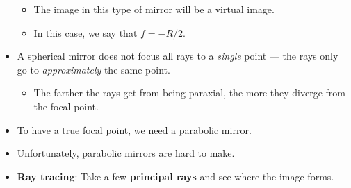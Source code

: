 \documentclass[../notes.tex]{subfiles}
\begin{document}
\begin{itemize}
    \begin{itemize}
        \item The image in this type of mirror will be a virtual image.
        \item In this case, we say that $f=-R/2$.
    \end{itemize}
    \item A spherical mirror does not focus all rays to a \emph{single} point --- the rays only go to \emph{approximately} the same point.
    \begin{itemize}
        \item The farther the rays get from being paraxial, the more they diverge from the focal point.
    \end{itemize}
    \item To have a true focal point, we need a parabolic mirror.
    \item Unfortunately, parabolic mirrors are hard to make.
    \item \textbf{Ray tracing}: Take a few \textbf{principal rays} and see where the image forms.
    \begin{figure}[h!]
        \centering
\end{figure}
\end{itemize}
\end{document}
